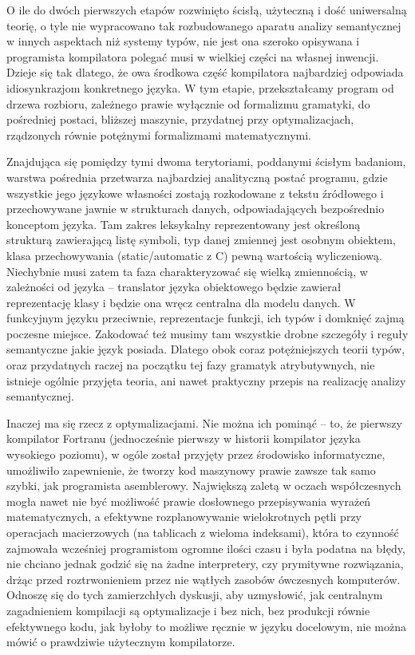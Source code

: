 O ile do dwóch pierwszych etapów rozwinięto ścisłą, użyteczną i dość uniwersalną teorię\cite{martin1998intuitionistic_types, TAPL}, o tyle nie wypracowano tak rozbudowanego aparatu analizy semantycznej w innych aspektach niż systemy typów, nie jest ona szeroko opisywana i programista kompilatora polegać musi w wielkiej części na własnej inwencji\cite{waite_goos}. Dzieje się tak dlatego, że owa środkowa część kompilatora najbardziej odpowiada idiosynkrazjom konkretnego języka. W tym etapie, przekształcamy program od drzewa rozbioru, zależnego prawie wyłącznie od formalizmu gramatyki, do pośredniej postaci, bliższej maszynie, przydatnej przy optymalizacjach, rządzonych równie potężnymi formalizmami matematycznymi. 

Znajdująca się pomiędzy tymi dwoma terytoriami, poddanymi ścisłym badaniom, warstwa pośrednia przetwarza najbardziej analityczną postać programu, gdzie wszystkie jego językowe własności zostają rozkodowane z tekstu źródłowego i przechowywane jawnie w strukturach danych, odpowiadających bezpośrednio konceptom języka. Tam zakres leksykalny reprezentowany jest określoną strukturą zawierającą listę symboli, typ danej zmiennej jest osobnym  obiektem, klasa przechowywania (static/automatic z C) pewną wartością wyliczeniową. Niechybnie musi zatem ta faza charakteryzować się wielką zmiennością, w zależności od języka – translator języka obiektowego będzie zawierał reprezentację klasy i będzie ona wręcz centralna dla modelu danych. W funkcyjnym języku przeciwnie, reprezentacje funkcji, ich typów i domknięć zajmą poczesne miejsce. Zakodować też musimy tam wszystkie drobne szczegóły i reguły semantyczne jakie język posiada. Dlatego obok coraz potężniejszych teorii typów, oraz przydatnych raczej na początku tej fazy gramatyk atrybutywnych, nie istnieje ogólnie przyjęta teoria, ani nawet praktyczny przepis na realizację analizy semantycznej.

Inaczej ma się rzecz z optymalizacjami. Nie można ich pominąć – to, że pierwszy kompilator Fortranu (jednocześnie pierwszy w historii kompilator języka wysokiego poziomu), w ogóle został przyjęty przez środowisko informatyczne, umożliwiło zapewnienie, że tworzy kod maszynowy prawie zawsze tak samo szybki, jak programista asemblerowy. Największą zaletą w oczach współczesnych mogła nawet nie być możliwość prawie dosłownego przepisywania wyrażeń matematycznych, a efektywne rozplanowywanie wielokrotnych pętli przy operacjach macierzowych (na tablicach z wieloma indeksami), która to czynność zajmowała wcześniej programistom ogromne ilości czasu i była podatna na błędy, nie chciano jednak godzić się na żadne interpretery, czy prymitywne rozwiązania, drżąc przed roztrwonieniem przez nie wątłych zasobów ówczesnych komputerów\cite{FORTRAN_AUTOMATIC_CODING_SYSTEM}.
Odnoszę się do tych zamierzchłych dyskusji, aby uzmysłowić, jak centralnym zagadnieniem kompilacji są optymalizacje i bez nich, bez produkcji równie efektywnego kodu, jak byłoby to możliwe ręcznie w języku docelowym, nie można mówić o prawdziwie użytecznym  kompilatorze.


